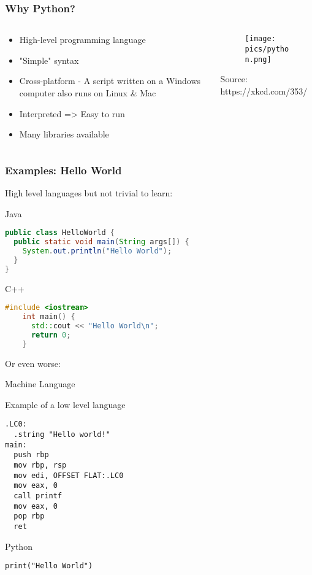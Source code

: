 \documentclass[10pt, a4paper]{beamer} %
\begin{document}
\begin{frame}[c]\frametitle{Why Python?}
	\begin{columns}
		\begin{column}{0.5\textwidth}
			\begin{itemize}
				\item High-level programming language
				\item "Simple" syntax
				\item Cross-platform - A script written on a Windows computer also runs on Linux \& Mac
				\item Interpreted => Easy to run
				\item Many libraries available
			\end{itemize}
		\end{column}
		\begin{column}{0.5\textwidth}  %
			\begin{figure}
				\texttt{[image: pics/python.png]}
			\end{figure}
			\tiny Source: https://xkcd.com/353/
		\end{column}
	\end{columns}

\end{frame}

\begin{frame}\frametitle{Examples: Hello World}
	High level languages but not trivial to learn:
	\begin{block}{Java}
		\begin{lstlisting}[language=Java]
public class HelloWorld {
  public static void main(String args[]) {
    System.out.println("Hello World");
  }
}
      \end{lstlisting}
	\end{block}

	\begin{block}{C++}
		{
			\begin{lstlisting}[language=C++, morekeywords=include]
	#include <iostream>
	int main() {
	  std::cout << "Hello World\n";
	  return 0;
	}
	  \end{lstlisting}
		}
	\end{block}
	\framebreak
	Or even worse:
	\begin{block}{Machine Language}

		Example of a low level language
		\begin{lstlisting}[language={}]
.LC0:
  .string "Hello world!"
main:
  push rbp
  mov rbp, rsp
  mov edi, OFFSET FLAT:.LC0
  mov eax, 0
  call printf
  mov eax, 0
  pop rbp
  ret
    \end{lstlisting}

	\end{block}

	\begin{block}{Python}
		\begin{lstlisting}
print("Hello World")
    \end{lstlisting}
	\end{block}

\end{frame}
\end{document}
